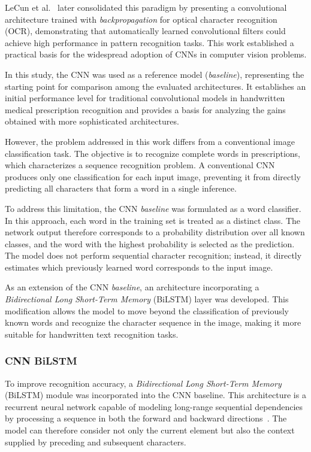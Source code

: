 \documentclass[11pt,a4paper]{article}
\begin{document}
LeCun et al.~\cite{lecun1998gradient} later consolidated this paradigm by presenting a convolutional architecture trained with \textit{backpropagation} for optical character recognition (OCR), demonstrating that automatically learned convolutional filters could achieve high performance in pattern recognition tasks. This work established a practical basis for the widespread adoption of CNNs in computer vision problems.

In this study, the CNN was used as a reference model (\textit{baseline}), representing the starting point for comparison among the evaluated architectures. It establishes an initial performance level for traditional convolutional models in handwritten medical prescription recognition and provides a basis for analyzing the gains obtained with more sophisticated architectures.

However, the problem addressed in this work differs from a conventional image classification task. The objective is to recognize complete words in prescriptions, which characterizes a sequence recognition problem. A conventional CNN produces only one classification for each input image, preventing it from directly predicting all characters that form a word in a single inference.

To address this limitation, the CNN \textit{baseline} was formulated as a word classifier. In this approach, each word in the training set is treated as a distinct class. The network output therefore corresponds to a probability distribution over all known classes, and the word with the highest probability is selected as the prediction. The model does not perform sequential character recognition; instead, it directly estimates which previously learned word corresponds to the input image.

As an extension of the CNN \textit{baseline}, an architecture incorporating a \textit{Bidirectional Long Short-Term Memory} (BiLSTM) layer was developed. This modification allows the model to move beyond the classification of previously known words and recognize the character sequence in the image, making it more suitable for handwritten text recognition tasks.

\newpage
\subsubsection{CNN BiLSTM}

To improve recognition accuracy, a \textit{Bidirectional Long Short-Term Memory} (BiLSTM) module was incorporated into the CNN baseline. This architecture is a recurrent neural network capable of modeling long-range sequential dependencies by processing a sequence in both the forward and backward directions~\cite{shi2016crnn}. The model can therefore consider not only the current element but also the context supplied by preceding and subsequent characters.
\end{document}
